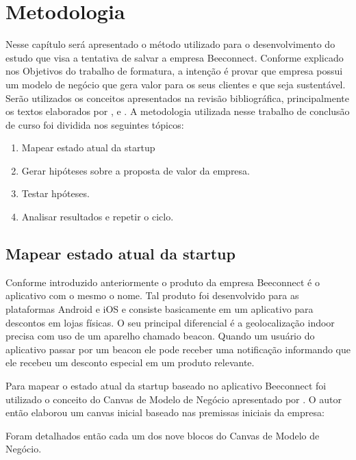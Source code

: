 \chapter[Metodologia]{Metodologia}
\label{chap:metodologia}
Nesse capítulo será apresentado o método utilizado para o desenvolvimento do estudo que visa a tentativa de salvar a empresa Beeconnect. Conforme explicado nos Objetivos do trabalho de formatura, a intenção é provar que empresa possui um modelo de negócio que gera valor para os seus clientes e que seja sustentável. Serão utilizados os conceitos apresentados na revisão bibliográfica, principalmente os textos elaborados por ,  e .
A metodologia utilizada nesse trabalho de conclusão de curso foi dividida nos seguintes tópicos:
\begin{enumerate}
\item Mapear estado atual da startup
\item Gerar hipóteses sobre a proposta de valor da empresa.
\item Testar hpóteses.
\item Analisar resultados e repetir o ciclo.
\end{enumerate}

\section{Mapear estado atual da startup}
\label{cha:mapear_estado}
Conforme introduzido anteriormente o produto da empresa Beeconnect é o aplicativo com o mesmo o nome. Tal produto foi desenvolvido para as plataformas Android e iOS e consiste basicamente em um aplicativo para descontos em lojas físicas. O seu principal diferencial é a geolocalização indoor precisa com uso de um aparelho chamado beacon. Quando um usuário do aplicativo passar por um beacon ele pode receber uma notificação informando que ele recebeu um desconto especial em um produto relevante.

Para mapear o estado atual da startup baseado no aplicativo Beeconnect foi utilizado o conceito do Canvas de Modelo de Negócio apresentado por . O autor então elaborou um canvas inicial baseado nas premissas iniciais da empresa: 





Foram detalhados então cada um dos nove blocos do Canvas de Modelo de Negócio.
